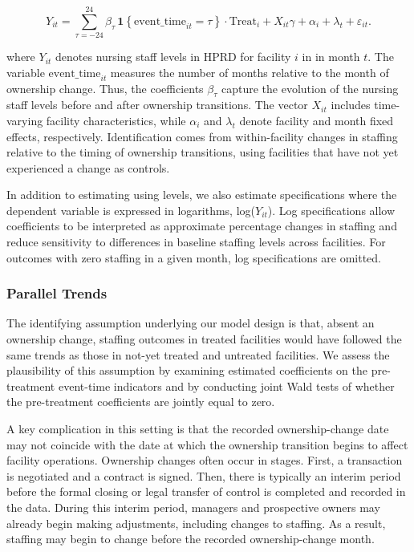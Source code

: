 \documentclass[12pt]{article}
\begin{document}
\begin{equation}
\label{eq:es_twfe}
Y_{it}
=
\sum_{\tau = -24}^{24}
    \beta_{\tau}\,
    \mathbf{1}\!\left\{ \text{event\_time}_{it} = \tau \right\}
    \cdot \text{Treat}_{i}
+
X_{it}\gamma
+
\alpha_i
+
\lambda_t
+
\varepsilon_{it}.
\end{equation}

where $Y_{it}$ denotes nursing staff levels in HPRD for facility $i$ in in month $t$. The variable $\text{event\_time}_{it}$ measures the number of months relative to the month of ownership change. Thus, the coefficients $\beta_{\tau}$ capture the evolution of the nursing staff levels before and after ownership transitions. The vector $X_{it}$ includes time-varying facility characteristics, while $\alpha_i$ and $\lambda_t$ denote facility and month fixed effects, respectively. Identification comes from within-facility changes in staffing relative to the timing of ownership transitions, using facilities that have not yet experienced a change as controls.

In addition to estimating using levels, we also estimate specifications where the dependent variable is expressed in logarithms, log($Y_{it}$). Log specifications allow coefficients to be interpreted as approximate percentage changes in staffing and reduce sensitivity to differences in baseline staffing levels across facilities. For outcomes with zero staffing in a given month, log specifications are omitted.

\subsubsection{Parallel Trends}

The identifying assumption underlying our model design is that, absent an ownership change, staffing outcomes in treated facilities would have followed the same trends as those in not-yet treated and untreated facilities. We assess the plausibility of this assumption by examining estimated coefficients on the pre-treatment event-time indicators and by conducting joint Wald tests of whether the pre-treatment coefficients are jointly equal to zero.

A key complication in this setting is that the recorded ownership-change date may not coincide with the date at which the ownership transition begins to affect facility operations. Ownership changes often occur in stages. First, a transaction is negotiated and a contract is signed. Then, there is typically an interim period before the formal closing or legal transfer of control is completed and recorded in the data. During this interim period, managers and prospective owners may already begin making adjustments, including changes to staffing. As a result, staffing may begin to change before the recorded ownership-change month.
\end{document}
